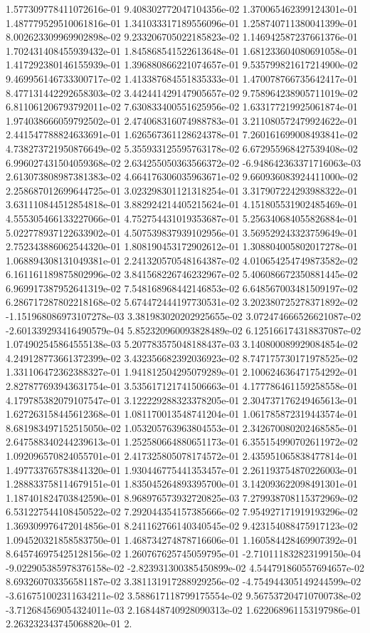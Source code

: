 1.577309778411072616e-01	9.408302772047104356e-02	1.370065462399124301e-01	1.487779529510061816e-01	1.341033317189556096e-01	1.258740711380041399e-01	8.002623309969902898e-02	9.233206705022185823e-02	1.146942587237661376e-01	1.702431408455939432e-01	1.845868541522613648e-01	1.681233604080691058e-01	1.417292380146155939e-01	1.396880866221074657e-01	9.535799821617214900e-02	9.469956146733300717e-02	1.413387684551835333e-01	1.470078766735642417e-01	8.477131442292658303e-02	3.442441429147905657e-02	9.758964238905711019e-02	6.811061206793792011e-02	7.630833400551625956e-02	1.633177219925061874e-01	1.974038666059792502e-01	2.474068316074988783e-01	3.211080572479924622e-01	2.441547788824633691e-01	1.626567361128624378e-01	7.260161699008493841e-02	4.738273721950876649e-02	5.355933125595763178e-02	6.672955968427539408e-02	6.996027431504059368e-02	2.634255050363566372e-02	-6.948642363371716063e-03	2.613073808987381383e-02	4.664176306035963671e-02	9.660936083924411000e-02	2.258687012699644725e-01	3.023298301121318254e-01	3.317907224293988322e-01	3.631110844512854818e-01	3.882924214405215624e-01	4.151805531902485469e-01	4.555305466133227066e-01	4.752754431019353687e-01	5.256340684055826884e-01	5.022778937122633902e-01	4.507539837939102956e-01	3.569529243323759649e-01	2.752343886062544320e-01	1.808190453172902612e-01	1.308804005802017278e-01	1.068894308131049381e-01	2.241320570548164387e-02	4.010654254749873582e-02	6.161161189875802996e-02	3.841568226746232967e-02	5.406086672350881445e-02	6.969917387952641319e-02	7.548168968442146853e-02	6.648567003481509197e-02	6.286717287802218168e-02	5.674472444197730531e-02	3.202380725278371892e-02	-1.151968086973107278e-03	3.381983020202925655e-02	3.072474666526621087e-02	-2.601339293416490579e-04	5.852320960093828489e-02	6.125166174318837087e-02	1.074902545864555138e-03	5.207783575048188437e-03	3.140800089929084854e-02	4.249128773661372399e-02	3.432356682392036923e-02	8.747175730171978525e-02	1.331106472362388327e-01	1.941812504295079289e-01	2.100624636471754292e-01	2.827877693943631754e-01	3.535617121741506663e-01	4.177786461159258558e-01	4.179785382079107547e-01	3.122229288323378205e-01	2.304737176249465613e-01	1.627263158445612368e-01	1.081170013548741204e-01	1.061785872319443574e-01	8.681983497152515050e-02	1.053205763963804553e-01	2.342670080202468585e-01	2.647588340244239613e-01	1.252580664880651173e-01	6.355154990702611972e-02	1.092096570824055701e-01	2.417325805078174572e-01	2.435951065838477814e-01	1.497733765783841320e-01	1.930446775441353457e-01	2.261193754870226003e-01	1.288833758114679151e-01	1.835045264893395700e-01	3.142093622098491301e-01	1.187401824703842590e-01	8.968976573932720825e-03	7.279938708115372969e-02	6.531227544108450522e-02	7.292044354157385666e-02	7.954927171919193296e-02	1.369309976472014856e-01	8.241162766140340545e-02	9.423154088475917123e-02	1.094520321858583750e-01	1.468734274878716606e-01	1.160584428469907392e-01	8.645746975425128156e-02	1.260767625745059795e-01	-2.710111832823199150e-04	-9.022905385978376158e-02	-2.823931300385450899e-02	4.544791860557694657e-02	8.693260703356581187e-02	3.381131917288929256e-02	-4.754944305149244599e-02	-3.616751002311634211e-02	3.588617118799175554e-02	9.567537204710700738e-02	-3.712684569054324011e-03	2.168448740928090313e-02	1.622068961153197986e-01	2.263232343745068820e-01	2.